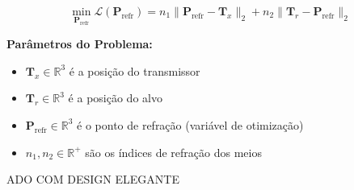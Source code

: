 \documentclass[12pt,a4paper]{article}
\begin{document}

\begin{destacadoazul}
\begin{equation}
\boxed{\min_{\mathbf{P}_{\text{refr}}} \mathcal{L}(\mathbf{P}_{\text{refr}}) = n_1 \|\mathbf{P}_{\text{refr}} - \mathbf{T}_x\|_2 + n_2 \|\mathbf{T}_r - \mathbf{P}_{\text{refr}}\|_2}
\label{eq:fermat}
\end{equation}
\end{destacadoazul}

\begin{tcolorbox}[colback=lightgray!20,colframe=darkgray,arc=5pt]
\textbf{Parâmetros do Problema:}
\begin{itemize}
    \item $\mathbf{T}_x \in \mathbb{R}^3$ é a posição do transmissor
    \item $\mathbf{T}_r \in \mathbb{R}^3$ é a posição do alvo
    \item $\mathbf{P}_{\text{refr}} \in \mathbb{R}^3$ é o ponto de refração (variável de otimização)
    \item $n_1, n_2 \in \mathbb{R}^+$ são os índices de refração dos meios
\end{itemize}
\end{tcolorbox}ADO COM DESIGN ELEGANTE
\end{document}
